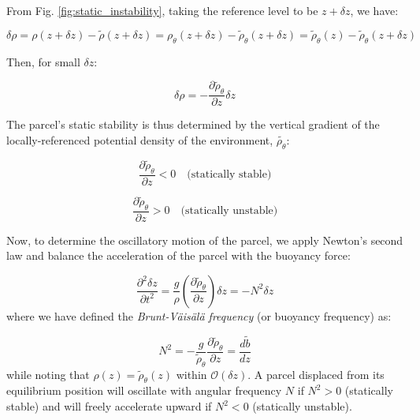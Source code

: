 \documentclass[12pt]{article}
\numberwithin{equation}{section}
\numberwithin{figure}{section}
\numberwithin{table}{section}
\begin{document}
From Fig. \ref{fig:static_instability}, taking the reference level to be 
$z + \delta z$, we have:

\begin{equation}
  \delta \rho = \rho(z + \delta z) - \widetilde{\rho}(z + \delta z) =
  \rho_\theta(z + \delta z) - \widetilde{\rho}_\theta(z + \delta z) =
  \widetilde{\rho}_\theta(z) - \widetilde{\rho}_\theta(z + \delta z)  
\end{equation}

Then, for small $\delta z$:

\begin{equation}
  \delta \rho = - \frac{\partial \widetilde{\rho}_\theta}{\partial z} \delta z
\end{equation}

The parcel's static stability is thus determined by the vertical gradient of
the locally-referenced potential density of the environment,
$\widetilde{\rho_\theta}$:

\begin{equation}
  \frac{\partial \widetilde{\rho}_\theta}{\partial z} < 0 \quad \text{(statically stable)}
\end{equation}

\begin{equation}
  \frac{\partial \widetilde{\rho}_\theta}{\partial z} > 0 \quad \text{(statically unstable)}
\end{equation}

Now, to determine the oscillatory motion of the parcel, we apply Newton's second
law and balance the acceleration of the parcel with the buoyancy force:

\begin{equation}
  \frac{\partial^2 \delta z}{\partial t^2} = \frac{g}{\rho} \left( \frac{\partial \widetilde{\rho}_\theta}{\partial z} \right) \delta z =
  - N^2 \delta z
\end{equation}
where we have defined the \textit{Brunt-Väisälä frequency}
(or buoyancy frequency) as:

\begin{equation}
  N^2 = - \frac{g}{\widetilde{\rho}_\theta} \frac{\partial \widetilde{\rho}_\theta}{\partial z} =
  \frac{d\widetilde{b}}{dz}
\end{equation}
while noting that $\rho(z) = \widetilde{\rho}_\theta(z)$ within
$\mathcal{O}(\delta z)$.
A parcel displaced from its equilibrium position will oscillate with angular
frequency $N$ if $N^2 > 0$ (statically stable) and will freely accelerate
upward if $N^2 < 0$ (statically unstable).
\end{document}
